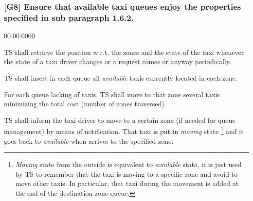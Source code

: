 \subsubsection{{[}G8{]} Ensure that available taxi queues enjoy the properties specified
in sub paragraph 1.6.2.}
\begin{lyxlist}{00.00.0000}
\item [{{[}R8.1{]}}] TS shall retrieve the position w.r.t. the zones and
the state of the taxi whenever the state of a taxi driver changes
or a request comes or anyway periodically.
\item [{{[}R8.2{]}}] TS shall insert in each queue all \emph{available}
taxis currently located in each zone.
\item [{{[}R8.3{]}}] For each queue lacking of taxis, TS shall move to
that zone several taxis minimizing the total cost (number of zones
traversed). 
\item [{{[}R8.4{]}}] TS shall inform the taxi driver to move to a certain
zone (if needed for queue management) by means of notification. That
taxi is put in \emph{moving} state%
\footnote{\emph{Moving} state from the outside is equivalent to \emph{available}
state, it is just used by TS to remember that the taxi is moving to
a specific zone and avoid to move other taxis. In particular, that
taxi during the movement is added at the end of the destination zone
queue.%
} and it goes back to \emph{available }when arrives to the specified
zone.\end{lyxlist}

